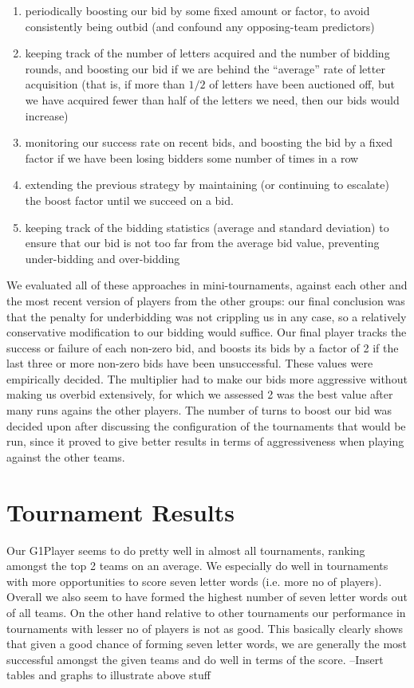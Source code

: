 \documentclass[11pt]{article}
\begin{document}
\begin{enumerate}
\item{} periodically boosting our bid by some fixed amount or factor, to avoid consistently being outbid (and confound any opposing-team predictors)
\item{} keeping track of the number of letters acquired and the number of bidding rounds, and boosting our bid if we are behind the ``average'' rate of letter acquisition (that is, if more than $1/2$ of letters have been auctioned off, but we have acquired fewer than half of the letters we need, then our bids would increase)
\item monitoring our success rate on recent bids, and boosting the bid by a fixed factor if we have been losing bidders some number of times in a row
\item extending the previous strategy by maintaining (or continuing to escalate) the boost factor until we succeed on a bid.
\item keeping track of the bidding statistics (average and standard deviation) to ensure that our bid is not too far from the average bid value, preventing under-bidding and over-bidding
\end{enumerate}

We evaluated all of these approaches in mini-tournaments, against each other and the most recent version of players from the other groups: our final conclusion was that the penalty for underbidding was not crippling us in any case, so a relatively conservative modification to our bidding would suffice.  Our final player tracks the success or failure of each non-zero bid, and boosts its bids by a factor of 2 if the last three or more non-zero bids have been unsuccessful. These values were empirically decided. The multiplier had to make our bids more aggressive without making us overbid extensively, for which we assessed 2 was the best value after many runs agains the other players. The number of turns to boost our bid was decided upon after discussing the configuration of the tournaments that would be run, since it proved to give better results in terms of aggressiveness when playing against the other teams. 

\section{Tournament Results} %
	Our G1Player seems to do pretty well in almost all tournaments, ranking amongst the top 2 teams on an average. We especially do well in tournaments with more opportunities to score seven letter words (i.e. more no of players). Overall we also seem to have formed the highest number of seven letter words out of all teams. On the other hand relative to other tournaments our performance in tournaments with lesser no of players is not as good. This basically clearly shows that given a good chance of forming seven letter words, we are generally the most successful amongst the given teams and do well in terms of the score. --Insert tables and graphs to illustrate above stuff
	
\end{document}
